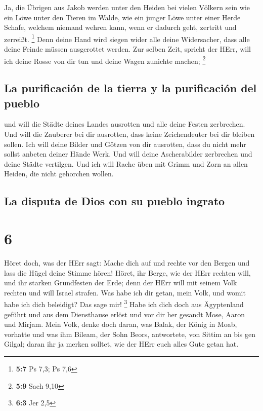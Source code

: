  Ja, die Übrigen aus Jakob werden unter den Heiden bei
vielen Völkern sein wie ein Löwe unter den Tieren im Walde, wie ein
junger Löwe unter einer Herde Schafe, welchem niemand wehren kann, wenn
er dadurch geht, zertritt und zerreißt. \footnote{\textbf{5:7} Ps 7,3;
  Ps 7,6}  Denn deine Hand wird siegen wider alle deine
Widersacher, dass alle deine Feinde müssen ausgerottet werden.
 Zur selben Zeit, spricht der HErr, will ich deine Rosse
von dir tun und deine Wagen zunichte machen; \footnote{\textbf{5:9} Sach
  9,10}

\hypertarget{la-purificaciuxf3n-de-la-tierra-y-la-purificaciuxf3n-del-pueblo}{%
\subsection{La purificación de la tierra y la purificación del
pueblo}\label{la-purificaciuxf3n-de-la-tierra-y-la-purificaciuxf3n-del-pueblo}}

 und will die Städte deines Landes ausrotten und alle
deine Festen zerbrechen.  Und will die Zauberer bei dir
ausrotten, dass keine Zeichendeuter bei dir bleiben sollen.
 Ich will deine Bilder und Götzen von dir ausrotten, dass
du nicht mehr sollst anbeten deiner Hände Werk.  Und will
deine Ascherabilder zerbrechen und deine Städte vertilgen.
 Und ich will Rache üben mit Grimm und Zorn an allen
Heiden, die nicht gehorchen wollen.

\hypertarget{la-disputa-de-dios-con-su-pueblo-ingrato}{%
\subsection{La disputa de Dios con su pueblo
ingrato}\label{la-disputa-de-dios-con-su-pueblo-ingrato}}

\hypertarget{section-5}{%
\section{6}\label{section-5}}

 Höret doch, was der HErr sagt: Mache dich auf und rechte
vor den Bergen und lass die Hügel deine Stimme hören! 
Höret, ihr Berge, wie der HErr rechten will, und ihr starken Grundfesten
der Erde; denn der HErr will mit seinem Volk rechten und will Israel
strafen.  Was habe ich dir getan, mein Volk, und womit
habe ich dich beleidigt? Das sage mir! \footnote{\textbf{6:3} Jer 2,5}
 Habe ich dich doch aus Ägyptenland geführt und aus dem
Diensthause erlöst und vor dir her gesandt Mose, Aaron und Mirjam.
 Mein Volk, denke doch daran, was Balak, der König in
Moab, vorhatte und was ihm Bileam, der Sohn Beors, antwortete, von
Sittim an bis gen Gilgal; daran ihr ja merken solltet, wie der HErr euch
alles Gute getan hat.

